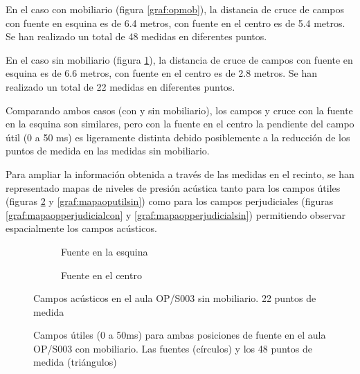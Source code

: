 En el caso con mobiliario (figura \ref{graf:opmob}), la distancia de cruce de campos con fuente en esquina es de 6.4 metros, con fuente en el centro es de 5.4 metros. Se han realizado un total de 48 medidas en diferentes puntos.

En el caso sin mobiliario (figura \ref{graf:opnomob}), la distancia de cruce de campos con fuente en esquina es de 6.6 metros, con fuente en el centro es de 2.8 metros. Se han realizado un total de 22 medidas en diferentes puntos. 

Comparando ambos casos (con y sin mobiliario), los campos y cruce con la fuente en la esquina son similares, pero con la fuente en el centro la pendiente del campo útil (0 a 50 ms) es ligeramente distinta debido posiblemente a la reducción de los puntos de medida en las medidas sin mobiliario.
\\
\par
Para ampliar la información obtenida a través de las medidas en el recinto, se han representado mapas de niveles de presión acústica tanto para los campos útiles (figuras \ref{graf:mapaoputilcon} y \ref{graf:mapaoputilsin}) como para los campos perjudiciales (figuras \ref{graf:mapaopperjudicialcon} y \ref{graf:mapaopperjudicialsin}) permitiendo observar espacialmente los campos acústicos.

\begin{figure}[H]
    \begin{subfigure}[b]{0.4\textwidth}
    	\centering%
         {%
    }
    \caption{Fuente en la esquina}%
    \end{subfigure}%
    \hspace{1.9cm}%
    \begin{subfigure}[b]{0.4\textwidth}%
    	\centering%
        {%
    }
    \caption{Fuente en el centro}%
    \end{subfigure}
    \caption{Campos acústicos en el aula OP/S003 sin mobiliario. 22 puntos de medida}
    \label{graf:opnomob}%
\end{figure}



\begin{figure}[H]
    \centering%
        {%
    }
    \caption{Campos útiles (0 a 50ms) para ambas posiciones de fuente en el aula OP/S003 con mobiliario. Las fuentes (círculos) y los 48 puntos de medida (triángulos)}
    \label{graf:mapaoputilcon}%
\end{figure}


